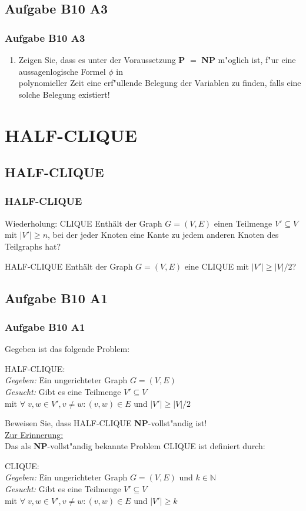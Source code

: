 \subsection{Aufgabe B10 A3}
\begin{frame}
	\frametitle{Aufgabe B10 A3}
	\begin{enumerate}
		\item Zeigen Sie, dass es unter der Voraussetzung \textbf{P} $=$ \textbf{NP} m"oglich
		ist, f"ur eine aussagenlogische Formel $\phi$ in\\
		polynomieller Zeit eine erf"ullende Belegung der Variablen zu finden, falls eine
		solche Belegung existiert!
	\end{enumerate}
\end{frame}

\section{HALF-CLIQUE}
\subsection{HALF-CLIQUE}
\begin{frame}
	\frametitle{HALF-CLIQUE}
	\begin{block}{Wiederholung: CLIQUE}
		Enthält der Graph $G = (V, E)$ einen Teilmenge $V' \subseteq V$ mit $|V'| \geq n$, bei der jeder Knoten eine Kante zu jedem anderen Knoten des Teilgraphs hat?
	\end{block}
	\begin{block}{HALF-CLIQUE}
		Enthält der Graph $G = (V, E)$ eine CLIQUE mit $|V'| \geq |V|/2$?
	\end{block}
\end{frame}
\subsection{Aufgabe B10 A1}
\begin{frame}
	\frametitle{Aufgabe B10 A1}
	Gegeben ist das folgende Problem:
	\begin{tabbing}
	HALF-CLIQUE:\\
	\textit{Gegeben:} \= Ein ungerichteter Graph $G = (V,E)$\\
	\textit{Gesucht:} \> Gibt es eine Teilmenge $V' \subseteq V$\\
	\> mit	$\forall \; v,w \in V', v \not= w: (v,w) \in E$ und $|V'| \geq |V|/2$
	\end{tabbing}
	Beweisen Sie, dass HALF-CLIQUE \textbf{NP}-vollst"andig ist!\\[4pt]
	\underline{Zur Erinnerung:}\\
	Das als \textbf{NP}-vollst"andig bekannte Problem CLIQUE ist definiert durch:
	\begin{tabbing}
	CLIQUE:\\
	\textit{Gegeben:} \= Ein ungerichteter Graph $G = (V,E)$ und $k \in \mathbb{N}$\\
	\textit{Gesucht:} \> Gibt es eine Teilmenge $V' \subseteq V$\\
	\> mit	$\forall \; v,w \in V', v \not= w: (v,w) \in E$ und $|V'| \geq k$
	\end{tabbing}
\end{frame}

